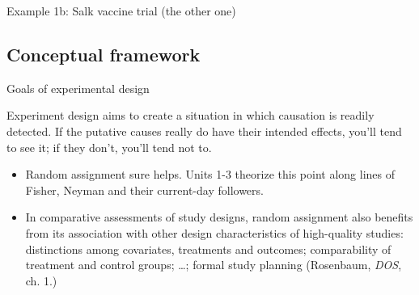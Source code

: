 \begin{frame}{Example 1b: Salk vaccine trial (the other one)}

\end{frame}

\subsection{Conceptual framework}
\begin{frame}{Goals of experimental design}

Experiment design aims to create a situation in which causation is
readily detected. If the putative causes
really do have their intended effects, you'll tend to see it; if they
don't, you'll tend not to.
\pause

\begin{itemize}[<+->]
\item \textrm{Random
    assignment}  sure helps. Units 1-3 theorize this point along lines
  of Fisher, Neyman and their current-day followers.
\item In comparative assessments of study designs, random assignment also benefits
  from its association with other design characteristics of
  high-quality studies:  distinctions among covariates, treatments and
  outcomes; comparability of treatment and control groups; \ldots;
  formal study planning (Rosenbaum, \textit{DOS}, ch. 1.)
\end{itemize}

\end{frame}


